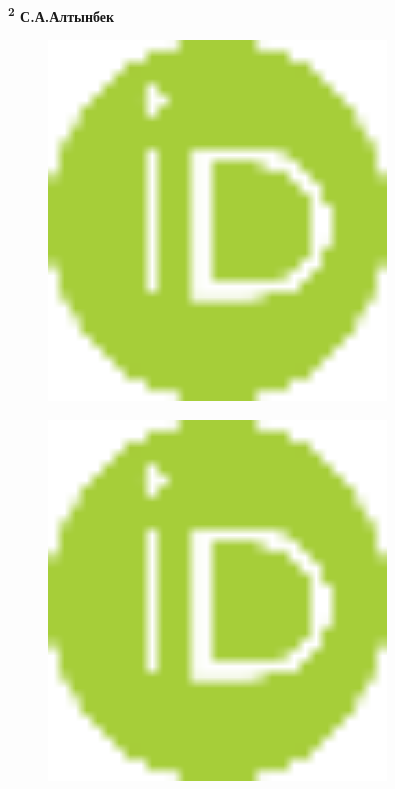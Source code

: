 {\bfseries \textsuperscript{2} С.А.Алтынбек}
\begin{figure}[H]
	\centering
	\includegraphics[width=0.8\textwidth]{media/ict2/image2}
	\caption*{}
\end{figure}

\begin{figure}[H]
	\centering
	\includegraphics[width=0.8\textwidth]{media/ict2/image2}
	\caption*{}
\end{figure}


